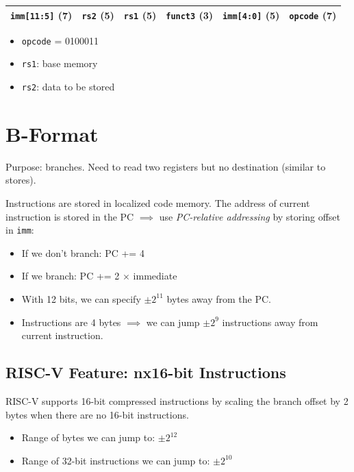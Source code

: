 \medskip
\begin{tabular}{|c|c|c|c|c|c|}
    \hline
    \texttt{imm[11:5]} (7) &
    \texttt{rs2} (5) &
    \texttt{rs1} (5) &
    \texttt{funct3} (3) &
    \texttt{imm[4:0]} (5) &
    \texttt{opcode} (7) \\
    \hline
\end{tabular}
\begin{itemize}
    \item \texttt{opcode} = 0100011
    \item \texttt{rs1}: base memory 
    \item \texttt{rs2}: data to be stored
\end{itemize}

\section{B-Format}
Purpose: branches. Need to read two registers but no destination (similar to stores).

Instructions are stored in localized code memory. The address of current instruction is stored in the PC $\implies$ use \emph{PC-relative addressing} by storing offset in \texttt{imm}:
\begin{itemize}
    \item If we don't branch: PC += 4
    \item If we branch: PC += 2 \(\times\) immediate
    \item With 12 bits, we can specify $\pm 2^{11}$ bytes away from the PC.
    \item Instructions are 4 bytes $\implies$ we can jump $\pm 2^9$ instructions away from current instruction.
\end{itemize}

\subsection{RISC-V Feature: nx16-bit Instructions}
RISC-V supports 16-bit compressed instructions by scaling the branch offset by 2 bytes when there are no 16-bit instructions.
\begin{itemize}
    \item Range of bytes we can jump to: \(\pm 2^{12}\)
    \item Range of 32-bit instructions we can jump to: \(\pm 2^{10}\)
\end{itemize}

